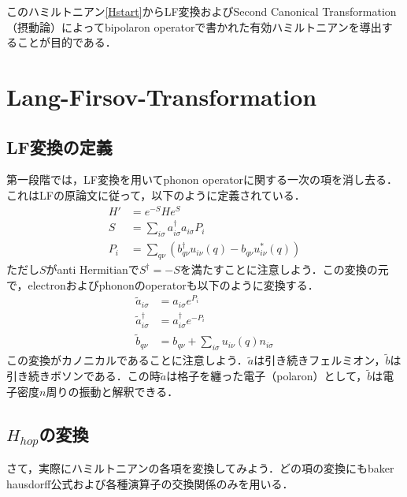 \documentclass[a4j]{jarticle}
\begin{document}
このハミルトニアン\eqref{Hstart}からLF変換およびSecond Canonical Transformation（摂動論）によってbipolaron operatorで書かれた有効ハミルトニアンを導出することが目的である．




\section{Lang-Firsov-Transformation}
\subsection{LF変換の定義}
第一段階では，LF変換を用いてphonon operatorに関する一次の項を消し去る．これはLFの原論文に従って，以下のように定義されている．
\begin{align}
 H'&=e^{-S}He^{S} \\
 S&=\sum_{i\sigma}a^{\dagger}_{i\sigma}a_{i\sigma}P_{i}\\
 P_i&=\sum_{q\nu}\left(b^{\dagger}_{q\nu}u_{i\nu}(q)-b_{q\nu}u_{i\nu}^*(q)\right)
\end{align}
ただし$S$がanti Hermitianで$S^{\dagger}=-S$を満たすことに注意しよう．この変換の元で，electronおよびphononのoperatorも以下のように変換する．
\begin{align}
 \tilde{a}_{i\sigma}&=a_{i\sigma}e^{P_i} \\
 \tilde{a}^{\dagger}_{i\sigma}&=a^{\dagger}_{i\sigma}e^{-P_i} \\
 \tilde{b}_{q\nu}&=b_{q\nu}+\sum_{i\sigma}u_{i\nu}(q)n_{i\sigma} 
\end{align}
この変換がカノニカルであることに注意しよう．$\tilde{a}$は引き続きフェルミオン，$\tilde{b}$は引き続きボソンである．この時$\tilde{a}$は格子を纏った電子（polaron）として，$\tilde{b}$は電子密度$n$周りの振動と解釈できる．



\subsection{$H_{hop}$の変換}
さて，実際にハミルトニアンの各項を変換してみよう．どの項の変換にもbaker hausdorff公式および各種演算子の交換関係のみを用いる．
\end{document}
